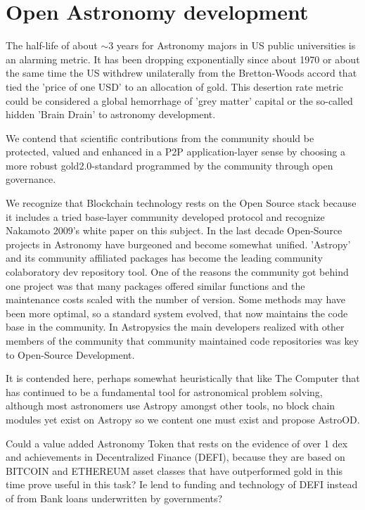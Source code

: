 \documentclass[final,5p,times,twocolumn,authoryear]{elsarticle}
\begin{document}
\section{Open Astronomy development}
\label{sec:btc2}
The half-life of about $\sim 3$ years for Astronomy majors in US public universities is an alarming metric. It has been dropping exponentially since about 1970 or about the same time the US withdrew unilaterally from the Bretton-Woods accord that tied the 'price of one USD' to an allocation of gold. This desertion rate metric could be considered a global hemorrhage of 'grey matter' capital or the so-called hidden 'Brain Drain' to astronomy development. 

We contend that scientific contributions from the community should be protected, valued and enhanced in a P2P application-layer sense by choosing a more robust gold2.0-standard programmed by the community through open governance.


We recognize that Blockchain technology rests on the Open Source stack because it includes a tried base-layer community developed protocol and recognize Nakamoto 2009's white paper on this subject. In the last decade Open-Source projects in Astronomy have burgeoned and become somewhat unified. 'Astropy' and its community affiliated packages has become the leading community colaboratory dev repository tool.  One of the reasons the community got behind one project was that many packages offered similar functions and the maintenance costs scaled with the number of version. Some methods may have been more optimal, so a standard system evolved, that now maintains the code base in the community. In Astropysics the main developers realized with other members of the community that community maintained code repositories was key to Open-Source Development.

It is contended here, perhaps somewhat heuristically that like The Computer that has continued to be a fundamental tool for astronomical problem solving, although most astronomers use Astropy amongst other tools, no block chain modules yet exist on Astropy so we content one must exist and propose AstroOD. 

Could a value added Astronomy Token that rests on the evidence of over 1 dex and achievements in Decentralized Finance (DEFI), because they are based on BITCOIN and ETHEREUM asset classes that have outperformed gold in this time prove useful in this task? Ie lend to funding and technology of DEFI instead of from Bank loans underwritten by governments?
\end{document}
